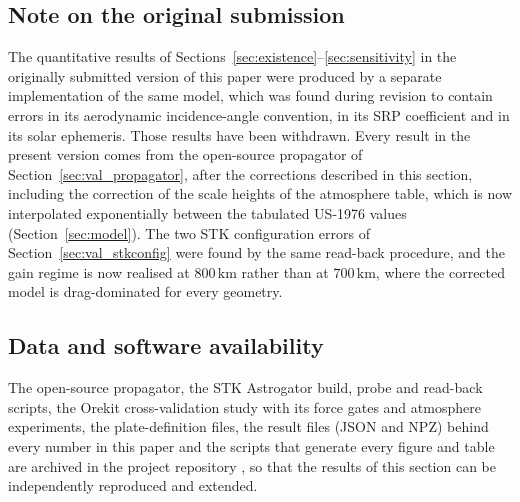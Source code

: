 \subsection{Note on the original submission}
\label{sec:val_note}
\noindent The quantitative results of Sections~\ref{sec:existence}--\ref{sec:sensitivity} in the originally submitted version of this paper were produced by a separate implementation of the same model, which was found during revision to contain errors in its aerodynamic incidence-angle convention, in its SRP coefficient and in its solar ephemeris. Those results have been withdrawn. Every result in the present version comes from the open-source propagator of Section~\ref{sec:val_propagator}, after the corrections described in this section, including the correction of the scale heights of the atmosphere table, which is now interpolated exponentially between the tabulated US-1976 values (Section~\ref{sec:model}). The two STK configuration errors of Section~\ref{sec:val_stkconfig} were found by the same read-back procedure, and the gain regime is now realised at \(800\,\mathrm{km}\) rather than at \(700\,\mathrm{km}\), where the corrected model is drag-dominated for every geometry.

\subsection{Data and software availability}
\label{sec:data}
\noindent The open-source propagator, the STK Astrogator build, probe and read-back scripts, the Orekit cross-validation study with its force gates and atmosphere experiments, the plate-definition files, the result files (JSON and NPZ) behind every number in this paper and the scripts that generate every figure and table are archived in the project repository \citep{svarogPropagatorCode2026}, so that the results of this section can be independently reproduced and extended.
\FloatBarrier

